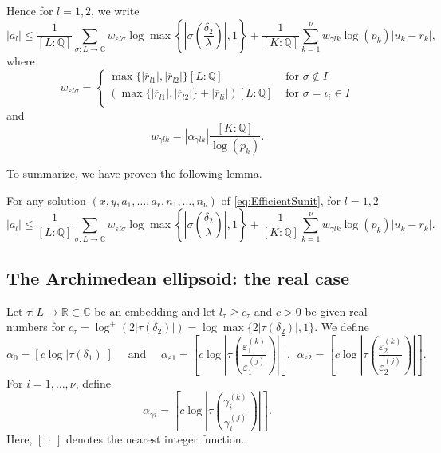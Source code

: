 Hence for $l = 1,2$, we write
\begin{equation} \label{eq:albound}
|a_l|	\leq \frac{1}{[L:\mathbb{Q}]}\sum_{\sigma :L \to \mathbb{C}} w_{\varepsilon l \sigma}\log \max \left\{ \left|\sigma\left(\frac{\delta_2}{\lambda}\right)\right|, 1\right\} + \frac{1}{[K:\mathbb{Q}]}\sum_{k = 1}^{\nu} w_{\gamma l k}\log(p_k)|u_k - r_k|,
\end{equation}
where
\begin{equation} \label{eq:welsigma}
w_{\varepsilon l \sigma} = 
\begin{cases}
\max\{|\overline{r}_{l1}|, |\overline{r}_{l2}|\}[L:\mathbb{Q}] & \text{ for } \sigma \notin I\\
\left(\max\{|\overline{r}_{l1}|, |\overline{r}_{l2}|\} + |\overline{r}_{li}|\right)[L:\mathbb{Q}] & \text{ for } \sigma = \iota_i \in I\\
\end{cases}
\end{equation}
and 
\begin{equation} \label{eq:wgammalk}
w_{\gamma l k} = |\alpha_{\gamma l k}|\frac{[K:\mathbb{Q}]}{\log(p_k)}.
\end{equation}

To summarize, we have proven the following lemma.
\begin{lemma}\label{lem:mepsbound}
For any solution $(x,y,a_1, \dots, a_r, n_1, \dots, n_{\nu})$ of \eqref{eq:EfficientSunit}, for $l =1,2$
\[|a_l| \leq \frac{1}{[L:\mathbb{Q}]}\sum_{\sigma :L \to \mathbb{C}} w_{\varepsilon l \sigma}\log \max \left\{ \left|\sigma\left(\frac{\delta_2}{\lambda}\right)\right|, 1\right\} + \frac{1}{[K:\mathbb{Q}]}\sum_{k = 1}^{\nu} w_{\gamma l k}\log(p_k)|u_k - r_k|.\]
\end{lemma}


\subsection{The Archimedean ellipsoid: the real case}
\label{subsec:ArchEllipsoid}

Let $\tau:L\to\mathbb{R} \subset \mathbb{C}$ be an embedding and let $l_\tau\geq c_\tau$ and $c>0$ be given real numbers for $c_\tau=\log^+(2|\tau(\delta_2)|)= \log \max\{2|\tau(\delta_2)|,1\}$. We define 
\begin{equation} \label{eq:alpha0eps}
\alpha_0 = [c\log|\tau(\delta_1)|] \quad \text{ and } \quad \alpha_{\varepsilon 1} =  \left[c\log\left|\tau\left(\frac{\varepsilon_1^{(k)}}{\varepsilon_1^{(j)}}\right)\right|\right],\ \  \alpha_{\varepsilon 2} =  \left[c\log\left|\tau\left(\frac{\varepsilon_2^{(k)}}{\varepsilon_2^{(j)}}\right)\right|\right].
\end{equation}
For $i = 1, \dots, \nu$, define
\begin{equation} \label{eq:alphagamma}
\alpha_{\gamma i} = \left[c\log\left|\tau\left(\frac{\gamma_i^{(k)}}{\gamma_i^{(j)}}\right)\right|\right].
\end{equation}
Here, $[ \ \cdot\  ]$ denotes the nearest integer function. 

